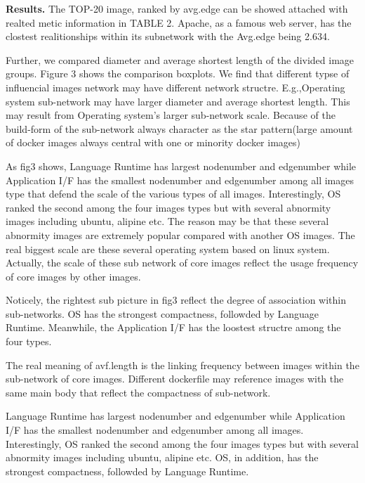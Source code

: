 \documentclass[sigconf]{acmart}
\begin{document}
\noindent\textbf{Results. }The TOP-20 image, ranked by avg.edge can be showed attached with realted metic information in TABLE 2. Apache, as a famous web server, has the clostest realitionships within its subnetwork with the Avg.edge being 2.634. 


Further, we compared diameter and average shortest length of the divided image groups. Figure 3 shows the comparison boxplots. We find that different typse of influencial images network may have different network structre. E.g.,Operating system sub-network may have larger diameter and average shortest length. This may result from Operating system's larger sub-network scale. Because of the build-form of the sub-network always character as the star pattern(large amount of docker images always central with one or minority docker images)  


As fig3 shows, Language Runtime has largest nodenumber and edgenumber while Application I/F has the smallest nodenumber and edgenumber among all images type that defend the scale of the various types of all images. Interestingly, OS ranked the second among the four images types but with several abnormity
images including ubuntu, alipine etc. The reason may be that these several abnormity images are extremely popular compared with another OS images. The real biggest scale are these several operating system based on linux system. Actually, the scale of these sub network of core images reflect the usage 
frequency of core images by other images. 

Noticely, the rightest sub picture in fig3 reflect the degree of association within sub-networks. OS has the strongest compactness, followded by Language Runtime. Meanwhile, the Application I/F has the loostest structre among the four types.

The real meaning of avf.length is the linking frequency between images within the sub-network of core images. Different dockerfile may reference images with the same main body that reflect the compactness of sub-network. 




\begin{mybox}
Language Runtime has largest nodenumber and edgenumber while Application I/F has the smallest nodenumber and edgenumber among all images. Interestingly, OS ranked the second among the four images types but with several abnormity images including ubuntu, alipine etc. OS, in addition, has the strongest compactness, followded by Language Runtime.
\end{mybox}
\end{document}
